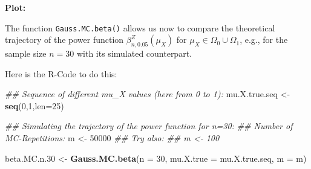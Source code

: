 \documentclass[]{book}
\newenvironment{Shaded}{\begin{snugshade}}{\end{snugshade}}
\newcommand{\CommentTok}[1]{\textcolor[rgb]{0.56,0.35,0.01}{\textit{#1}}}
\newcommand{\DataTypeTok}[1]{\textcolor[rgb]{0.13,0.29,0.53}{#1}}
\newcommand{\DecValTok}[1]{\textcolor[rgb]{0.00,0.00,0.81}{#1}}
\newcommand{\FloatTok}[1]{\textcolor[rgb]{0.00,0.00,0.81}{#1}}
\newcommand{\KeywordTok}[1]{\textcolor[rgb]{0.13,0.29,0.53}{\textbf{#1}}}
\newcommand{\NormalTok}[1]{#1}
\newcommand{\StringTok}[1]{\textcolor[rgb]{0.31,0.60,0.02}{#1}}
\theoremstyle{definition}
\theoremstyle{definition}
\theoremstyle{definition}
\theoremstyle{remark}
\begin{document}
\textbf{Plot:}

The function \texttt{Gauss.MC.beta()} allows us now to compare the theoretical trajectory of the power function
\(\beta^{Z}_{n,0.05}(\mu_X)\) for \(\mu_X\in\Omega_0\cup\Omega_1\), e.g., for the sample size \(n=30\) with its simulated counterpart.

Here is the R-Code to do this:

\begin{Shaded}
\begin{Highlighting}[]
\CommentTok{## Sequence of different mu_X values (here from 0 to 1):}
\NormalTok{mu.X.true.seq   <-}\StringTok{ }\KeywordTok{seq}\NormalTok{(}\DecValTok{0}\NormalTok{,}\DecValTok{1}\NormalTok{,}\DataTypeTok{len=}\DecValTok{25}\NormalTok{)}

\CommentTok{## Simulating the trajectory of the power function for n=30:}
\CommentTok{## Number of MC-Repetitions:}
\NormalTok{m <-}\StringTok{ }\DecValTok{50000}  
\CommentTok{## Try also: }
\CommentTok{## m <- 100}

\NormalTok{beta.MC.n}\FloatTok{.30}\NormalTok{       <-}\StringTok{ }\KeywordTok{Gauss.MC.beta}\NormalTok{(}\DataTypeTok{n         =} \DecValTok{30}\NormalTok{, }
                                    \DataTypeTok{mu.X.true =}\NormalTok{ mu.X.true.seq,}
                                    \DataTypeTok{m         =}\NormalTok{ m)}


\end{Highlighting}
\end{Shaded}
\end{document}
